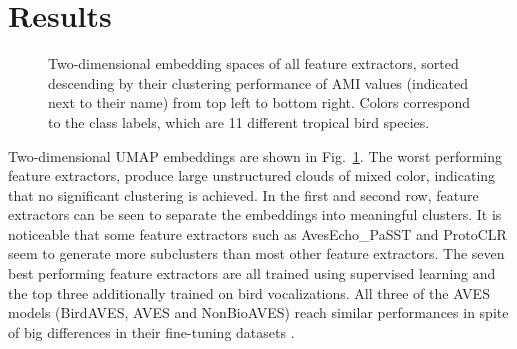 \section{Results}
\label{sec:results}

\begin{figure}[ht]
    \centerline{}
    \caption{Two-dimensional embedding spaces of all feature extractors, sorted descending by their clustering performance of AMI values (indicated next to their name) from top left to bottom right.
    Colors correspond to the class labels, which are 11 different tropical bird species.}
    \label{fig:embeds}
\end{figure}


Two-dimensional UMAP embeddings are shown in Fig.~\ref{fig:embeds}.
The worst performing feature extractors, produce large unstructured clouds of mixed color, indicating that no significant clustering is achieved.
In the first and second row, feature extractors can be seen to separate the embeddings into meaningful clusters.
It is noticeable that some feature extractors such as AvesEcho\_PaSST and ProtoCLR seem to generate more subclusters than most other feature extractors.
The seven best performing feature extractors are all trained using supervised learning and the top three additionally trained on bird vocalizations.
All three of the AVES models (BirdAVES, AVES and NonBioAVES) reach similar performances in spite of big differences in their fine-tuning datasets \cite{hagiwara_aves_2022}.


